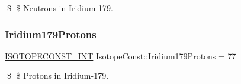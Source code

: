 \$ \$ Neutrons in Iridium-\/179. \mbox{\label{group___isotope_const-_iridium-_ir179_ga0f77ac7ca9d7f856b0b91b18faa1d7e5}} 
\subsubsection{\texorpdfstring{Iridium179\+Protons}{Iridium179Protons}}
{\footnotesize\ttfamily \mbox{\hyperlink{group___isotope_const-_macros_ga5f18360b3e99483a35c32d789e62621c}{I\+S\+O\+T\+O\+P\+E\+C\+O\+N\+S\+T\+\_\+\+I\+NT}} Isotope\+Const\+::\+Iridium179\+Protons = 77}

\$ \$ Protons in Iridium-\/179. 